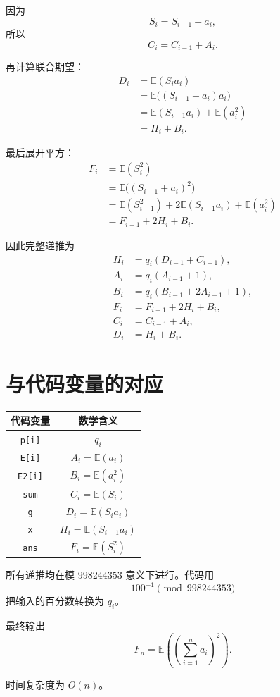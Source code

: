 \documentclass[UTF8]{ctexart}
\begin{document}
因为
\[
S_i=S_{i-1}+a_i,
\]
所以
\[
C_i=C_{i-1}+A_i.
\]

再计算联合期望：
\[
\begin{aligned}
D_i
&=\mathbb E(S_i a_i)\\
&=\mathbb E\bigl((S_{i-1}+a_i)a_i\bigr)\\
&=\mathbb E(S_{i-1}a_i)+\mathbb E(a_i^2)\\
&=H_i+B_i.
\end{aligned}
\]

最后展开平方：
\[
\begin{aligned}
F_i
&=\mathbb E(S_i^2)\\
&=\mathbb E\bigl((S_{i-1}+a_i)^2\bigr)\\
&=\mathbb E(S_{i-1}^2)
  +2\mathbb E(S_{i-1}a_i)
  +\mathbb E(a_i^2)\\
&=F_{i-1}+2H_i+B_i.
\end{aligned}
\]

因此完整递推为
\[
\boxed{
\begin{aligned}
H_i&=q_i(D_{i-1}+C_{i-1}),\\
A_i&=q_i(A_{i-1}+1),\\
B_i&=q_i(B_{i-1}+2A_{i-1}+1),\\
F_i&=F_{i-1}+2H_i+B_i,\\
C_i&=C_{i-1}+A_i,\\
D_i&=H_i+B_i.
\end{aligned}}
\]

\section*{与代码变量的对应}

\begin{center}
\begin{tabular}{cc}
\toprule
代码变量 & 数学含义\\
\midrule
\texttt{p[i]} & $q_i$\\
\texttt{E[i]} & $A_i=\mathbb E(a_i)$\\
\texttt{E2[i]} & $B_i=\mathbb E(a_i^2)$\\
\texttt{sum} & $C_i=\mathbb E(S_i)$\\
\texttt{g} & $D_i=\mathbb E(S_i a_i)$\\
\texttt{x} & $H_i=\mathbb E(S_{i-1}a_i)$\\
\texttt{ans} & $F_i=\mathbb E(S_i^2)$\\
\bottomrule
\end{tabular}
\end{center}

所有递推均在模 $998244353$ 意义下进行。代码用
\[
100^{-1}\pmod {998244353}
\]
把输入的百分数转换为 $q_i$。

最终输出
\[
F_n=\mathbb E\left(\left(\sum_{i=1}^{n}a_i\right)^2\right).
\]

时间复杂度为 $O(n)$。
\end{document}
